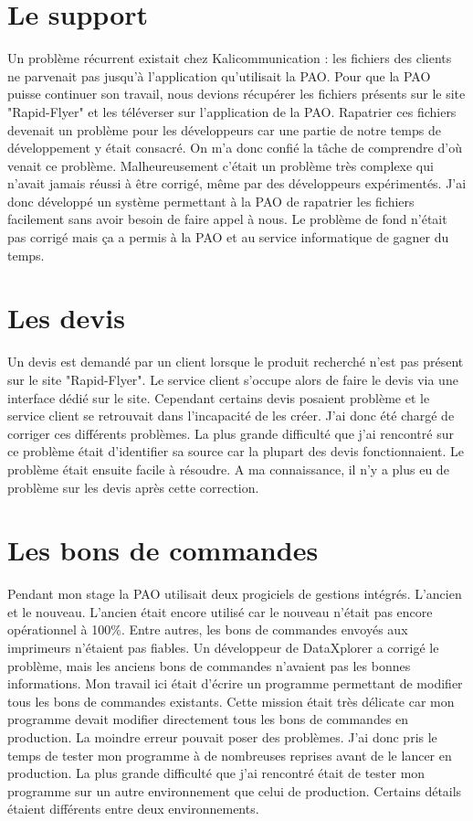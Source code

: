 
\section{Le support}
Un problème récurrent existait chez Kalicommunication : les fichiers des clients ne parvenait pas jusqu'à l'application qu'utilisait la PAO. Pour que la PAO puisse continuer son travail, nous devions récupérer les fichiers présents sur le site "Rapid-Flyer" et les téléverser sur l'application de la PAO.\newline
Rapatrier ces fichiers devenait un problème pour les développeurs car une partie de notre temps de développement y était consacré.\newline
On m'a donc confié la tâche de comprendre d'où venait ce problème. Malheureusement c'était un problème très complexe qui n'avait jamais réussi à être corrigé, même par des développeurs expérimentés. J'ai donc développé un système permettant à la PAO de rapatrier les fichiers facilement sans avoir besoin de faire appel à nous. Le problème de fond n'était pas corrigé mais ça a permis à la PAO et au service informatique de gagner du temps.

\section{Les devis}
Un devis est demandé par un client lorsque le produit recherché n'est pas présent sur le site "Rapid-Flyer". Le service client s'occupe alors de faire le devis via une interface dédié sur le site. Cependant certains devis posaient problème et le service client se retrouvait dans l'incapacité de les créer.\newline
J'ai donc été chargé de corriger ces différents problèmes. La plus grande difficulté que j'ai rencontré sur ce problème était d'identifier sa source car la plupart des devis fonctionnaient. Le problème était ensuite facile à résoudre. A ma connaissance, il n'y a plus eu de problème sur les devis après cette correction.

\section{Les bons de commandes}
Pendant mon stage la PAO utilisait deux progiciels de gestions intégrés. L'ancien et le nouveau. L'ancien était encore utilisé car le nouveau n'était pas encore opérationnel à 100\%. Entre autres, les bons de commandes envoyés aux imprimeurs n'étaient pas fiables. Un développeur de DataXplorer a corrigé le problème, mais les anciens bons de commandes n'avaient pas les bonnes informations. Mon travail ici était d'écrire un programme permettant de modifier tous les bons de commandes existants. Cette mission était très délicate car mon programme devait modifier directement tous les bons de commandes en production. La moindre erreur pouvait poser des problèmes. J'ai donc pris le temps de tester mon programme à de nombreuses reprises avant de le lancer en production. La plus grande difficulté que j'ai rencontré était de tester mon programme sur un autre environnement que celui de production. Certains détails étaient différents entre deux environnements.

